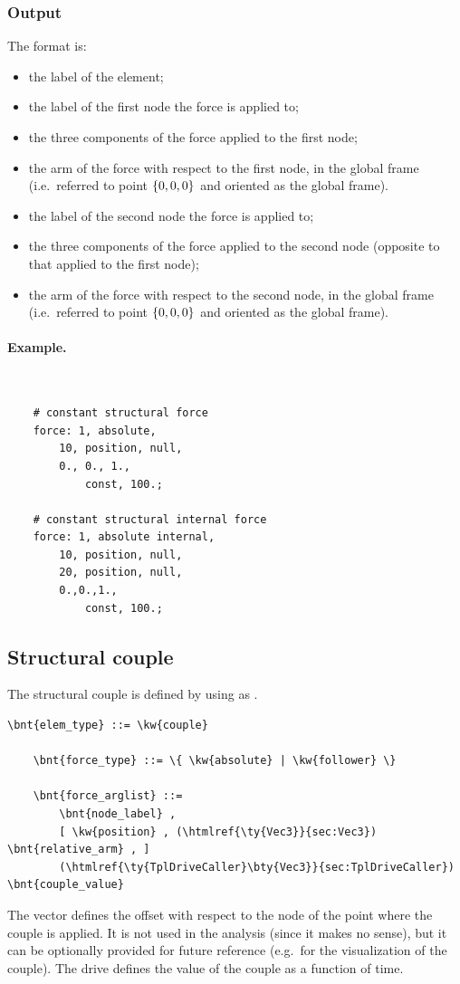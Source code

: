 \subsubsection{Output}
The format is:
\begin{itemize}
    \item the label of the element;
    \item the label of the first node the force is applied to;
    \item the three components of the force applied to the first node;
    \item the arm of the force with respect to the first node,
	  in the global frame (i.e.\ referred to point $ \left\{ 0,0,0 \right\} $
	  and oriented as the global frame).
    \item the label of the second node the force is applied to;
    \item the three components of the force applied to the second node
	  (opposite to that applied to the first node);
    \item the arm of the force with respect to the second node,
	  in the global frame (i.e.\ referred to point $ \left\{ 0,0,0 \right\} $
	  and oriented as the global frame).
\end{itemize}

\paragraph{Example.} \
\begin{verbatim}
    # constant structural force
    force: 1, absolute,
        10, position, null,
        0., 0., 1.,
            const, 100.;

    # constant structural internal force
    force: 1, absolute internal,
        10, position, null,
        20, position, null,
        0.,0.,1.,
            const, 100.;
\end{verbatim}


\subsection{Structural couple}
\label{sec:EL:FORCE:STRUCTURAL:COUPLE}
The structural couple is defined by using  as .
\begin{Verbatim}[commandchars=\\\{\}]
    \bnt{elem_type} ::= \kw{couple}

    \bnt{force_type} ::= \{ \kw{absolute} | \kw{follower} \} 

    \bnt{force_arglist} ::=
        \bnt{node_label} ,
        [ \kw{position} , (\htmlref{\ty{Vec3}}{sec:Vec3}) \bnt{relative_arm} , ]
        (\htmlref{\ty{TplDriveCaller}\bty{Vec3}}{sec:TplDriveCaller}) \bnt{couple_value}
\end{Verbatim}
The vector  defines the offset with respect
to the node of the point where the couple is applied.
It is not used in the analysis (since it makes no sense),
but it can be optionally provided for future reference
(e.g.\ for the visualization of the couple).
The drive  defines the value of the couple
as a function of time.

